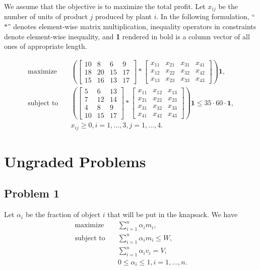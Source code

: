\documentclass{article}
\begin{document}
We assume that the objective is to maximize the total profit. Let $x_{ij}$ be the number of units of product $j$ produced by plant $i$. In the following formulation, ``$*$'' denotes element-wise matrix multiplication, inequality operators in constraints denote element-wise inequality, and \textbf{1} rendered in bold is a column vector of all ones of appropriate length.

\begin{align*}
    \textrm{maximize}\quad &\left(\begin{bmatrix}
        10 & 8 & 6 & 9\\
        18 & 20 & 15 & 17\\
        15 & 16 & 13 & 17
    \end{bmatrix}
    * \begin{bmatrix}
        x_{11} & x_{21} & x_{31} & x_{41}\\
        x_{12} & x_{22} & x_{32} & x_{42}\\
        x_{13} & x_{23} & x_{33} & x_{43}
    \end{bmatrix}\right)
    \mathbf{1},\\
    \textrm{subject to}\quad &\left(\begin{bmatrix}
        5 & 6 & 13\\
        7 & 12 & 14\\
        4 & 8 & 9\\
        10 & 15 & 17
    \end{bmatrix}
    * \begin{bmatrix}
        x_{11} & x_{12} & x_{13}\\
        x_{21} & x_{22} & x_{23}\\
        x_{31} & x_{32} & x_{33}\\
        x_{41} & x_{42} & x_{43}
    \end{bmatrix}\right) \mathbf{1}
    \le 35 \cdot 60 \cdot \mathbf{1},\\
    & x_{ij} \ge 0, i = 1, \dots, 3, j = 1, \dots, 4.
\end{align*}

\section*{Ungraded Problems}

\subsection*{Problem 1}

Let $\alpha_i$ be the fraction of object $i$ that will be put in the knapsack. We have
\begin{align*}
    \textrm{maximize}\quad &\sum_{i = 1}^n \alpha_im_i,\\
    \textrm{subject to}\quad &\sum_{i = 1}^n \alpha_im_i \le W,\\
    &\sum_{i = 1}^n \alpha_iv_i = V,\\
    &0 \le \alpha_i \le 1, i = 1, \dots, n.
\end{align*}
\end{document}
